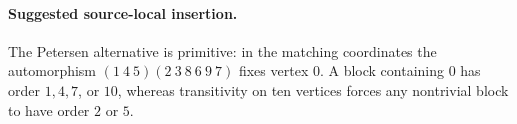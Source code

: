 \documentclass[11pt]{article}
\begin{document}
\paragraph{Suggested source-local insertion.}
The Petersen alternative is primitive: in the
matching coordinates the automorphism
\((1\ 4\ 5)(2\ 3\ 8\ 6\ 9\ 7)\) fixes vertex \(0\).
A block containing \(0\) has order \(1,4,7\), or
\(10\), whereas transitivity on ten vertices
forces any nontrivial block to have order \(2\) or \(5\).
\end{document}
